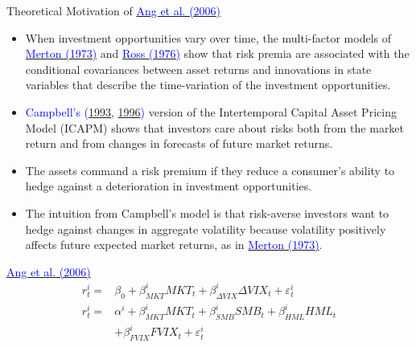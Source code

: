 \documentclass{beamer}
\begin{document}
\begin{frame}{Theoretical Motivation of \href{https://doi.org/10.1111/j.1540-6261.2006.00836.x}{\textcolor{blue}{Ang et al. (2006)}}}
	\begin{itemize}
		\item When investment opportunities vary over time, the multi-factor models of \href{https://doi.org/10.2307/1913811}{\textcolor{blue}{Merton (1973)}} and \href{https://doi.org/10.1142/9789814417358_0001}{\textcolor{blue}{Ross (1976)}} show that risk premia are associated with the conditional covariances between asset returns and innovations in state variables that describe the time-variation of the investment opportunities.
		\item \textcolor{blue}{Campbell’s (\href{https://www.jstor.org/stable/2117530}{1993}, \href{https://doi.org/10.1086/262026}{1996})} version of the Intertemporal Capital Asset Pricing Model
		(ICAPM) shows that investors care about risks both from the market return and from changes in forecasts of future market returns.
		\item The assets command a risk premium if they reduce a consumer's ability to hedge against a deterioration in investment opportunities.
		\item The intuition from Campbell’s model is that risk-averse investors want to hedge against changes in aggregate volatility because volatility positively
		affects future expected market returns, as in \href{https://doi.org/10.2307/1913811}{\textcolor{blue}{Merton (1973)}}.
	\end{itemize}
\end{frame}

\begin{frame}{\href{https://doi.org/10.1111/j.1540-6261.2006.00836.x}{\textcolor{blue}{Ang et al. (2006)}}}
	\begin{equation}\label{model of ang 2006}
		\begin{aligned}
			r_{t}^{i}= & \beta_{0}+\beta_{M K T}^{i} M K T_{t}+\beta_{\Delta V I X}^{i} \Delta V I X_{t}+\varepsilon_{t}^{i} \\
			r_{t}^{i}=& \alpha^{i}+\beta_{M K T}^{i} M K T_{t}+\beta_{S M B}^{i} S M B_{t}+\beta_{H M L}^{i} H M L_{t} \\
			&+\beta_{F V I X}^{i} F V I X_{t}+\varepsilon_{t}^{i}
		\end{aligned}
	\end{equation}
\end{frame}
\end{document}
